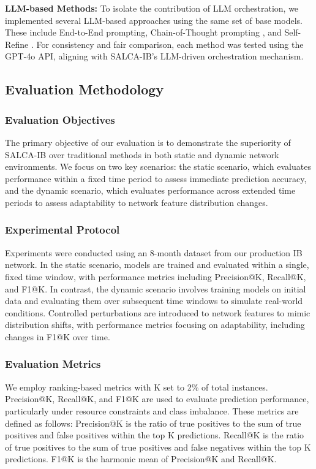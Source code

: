 \documentclass[conference]{IEEEtran}
\begin{document}
\textbf{LLM-based Methods:} To isolate the contribution of LLM orchestration, we implemented several LLM-based approaches using the same set of base models. These include End-to-End prompting, Chain-of-Thought prompting \cite{chen2023}, and Self-Refine \cite{madaan2023}. For consistency and fair comparison, each method was tested using the GPT-4o API, aligning with SALCA-IB's LLM-driven orchestration mechanism.

\subsection{Evaluation Methodology}

\subsubsection{Evaluation Objectives}
The primary objective of our evaluation is to demonstrate the superiority of SALCA-IB over traditional methods in both static and dynamic network environments. We focus on two key scenarios: the static scenario, which evaluates performance within a fixed time period to assess immediate prediction accuracy, and the dynamic scenario, which evaluates performance across extended time periods to assess adaptability to network feature distribution changes.

\subsubsection{Experimental Protocol}
Experiments were conducted using an 8-month dataset from our production IB network. In the static scenario, models are trained and evaluated within a single, fixed time window, with performance metrics including Precision@K, Recall@K, and F1@K. In contrast, the dynamic scenario involves training models on initial data and evaluating them over subsequent time windows to simulate real-world conditions. Controlled perturbations are introduced to network features to mimic distribution shifts, with performance metrics focusing on adaptability, including changes in F1@K over time.

\subsubsection{Evaluation Metrics}
We employ ranking-based metrics with K set to 2\% of total instances. Precision@K, Recall@K, and F1@K are used to evaluate prediction performance, particularly under resource constraints and class imbalance. These metrics are defined as follows: Precision@K is the ratio of true positives to the sum of true positives and false positives within the top K predictions. Recall@K is the ratio of true positives to the sum of true positives and false negatives within the top K predictions. F1@K is the harmonic mean of Precision@K and Recall@K.
\end{document}
